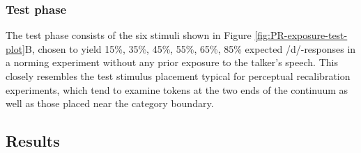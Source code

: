 \documentclass[
  11pt,
  english,
  man,floatsintext]{apa6}
\begin{document}
\hypertarget{test-phase}{%
\subsubsection{Test phase}\label{test-phase}}

The test phase consists of the six stimuli shown in Figure \ref{fig:PR-exposure-test-plot}B, chosen to yield 15\%, 35\%, 45\%, 55\%, 65\%, 85\% expected /d/-responses in a norming experiment without any prior exposure to the talker's speech. This closely resembles the test stimulus placement typical for perceptual recalibration experiments, which tend to examine tokens at the two ends of the continuum as well as those placed near the category boundary.

\hypertarget{results}{%
\subsection{Results}\label{results}}
\end{document}
